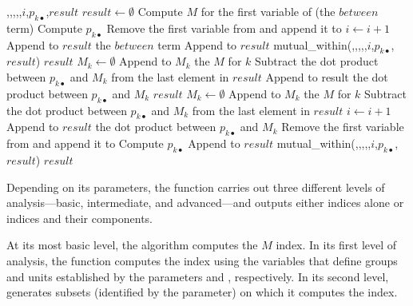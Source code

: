 \begin{algorithm}[H]
\caption{\small {}}\label{alg:mutual_within}
\small
\begin{algorithmic}
\Require {},,,,,$i$,$p_{k \bullet}$,$result$
    \State $result \gets \emptyset$
    \State Compute $M$ for the first variable of  (the $between$ term)
    \State Compute $p_{k \bullet}$
    \State Remove the first variable from  and append it to 
    \State $i \gets i+1$
    \State Append to $result$ the $between$ term
    \State Append to $result$ mutual\_within(,,,,,$i$,$p_{k \bullet}$,$result$)
    \Return $result$
    \State $M_k \gets \emptyset$
        \State Append to $M_k$ the $M$ for $k$
    \EndFor
        \State Subtract the dot product between $p_{k \bullet}$ and $M_k$ from the last element in $result$
    \EndIf
    \State Append to result the dot product between $p_{k \bullet}$ and $M_k$
    \Return $result$
    \Else
        \State $M_k \gets \emptyset$
              \State Append to $M_k$ the $M$ for $k$
        \EndFor
            \State Subtract the dot product between $p_{k \bullet}$ and $M_k$ from the last element in $result$
        \EndIf
        \State $i \gets i+1$
        \State Append to $result$ the dot product between $p_{k \bullet}$ and $M_k$ 
        \State Remove the first variable from  and append it to 
        \State Compute $p_{k \bullet}$
        \State Append to $result$ mutual\_within(,,,,,$i$,$p_{k \bullet}$,$result$)
        \Return $result$
\EndIf
\end{algorithmic}
\end{algorithm}

Depending on its parameters, the  function carries out three different levels of analysis---basic, intermediate, and advanced---and outputs either indices alone or indices and their components. 

At its most basic level, the algorithm computes the $M$ index. In its first level of analysis, the  function computes the index using the variables that define groups and units established by the parameters  and , respectively. In its second level,  generates subsets (identified by the  parameter) on which it computes the index.

